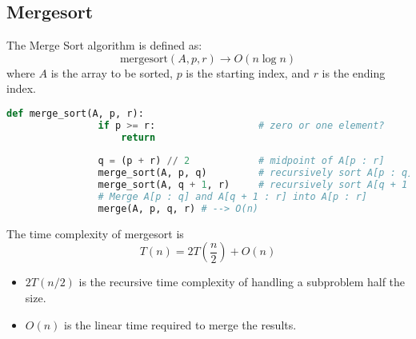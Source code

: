 \subsection{Mergesort}
    \begin{definition}
        The Merge Sort algorithm is defined as:
        \begin{equation}
            \text{mergesort}(A, p, r) \rightarrow O(n \log n)
        \end{equation}
        where \( A \) is the array to be sorted, \( p \) is the starting index, and \( r \) is the ending index.   
       
        \begin{lstlisting}[language=Python, caption=Merge Sort Pseudocode]
            def merge_sort(A, p, r):
                if p >= r:                  # zero or one element?
                    return
                
                q = (p + r) // 2            # midpoint of A[p : r] 
                merge_sort(A, p, q)         # recursively sort A[p : q] --> T(n/2)
                merge_sort(A, q + 1, r)     # recursively sort A[q + 1 : r] --> T(n/2)
                # Merge A[p : q] and A[q + 1 : r] into A[p : r]
                merge(A, p, q, r) # --> O(n)
        \end{lstlisting}   
        \vspace{1em}
        The time complexity of mergesort is
        \begin{equation}
            T(n) = 2T\left(\frac{n}{2}\right) + O(n)
        \end{equation} 
        \begin{itemize}
            \item $2T(n/2)$ is the recursive time complexity of handling a subproblem half the size. 
            \item $O(n)$ is the linear time required to merge the results.
        \end{itemize}
    \end{definition}


